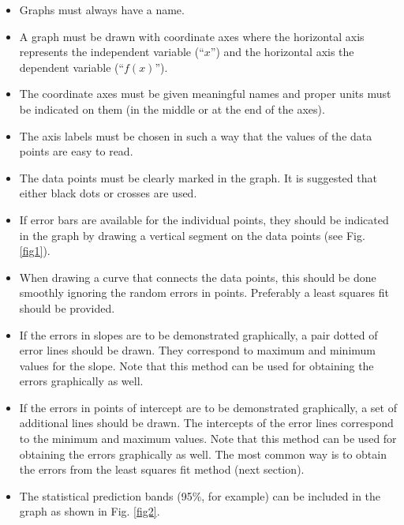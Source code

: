 \documentclass[byrevtex,amssymb,aps,pra,floatfix,letterpaper]{revtex4}
\begin{document}
\begin{itemize}
\item Graphs must always have a name.
\item A graph must be drawn with coordinate axes where the horizontal axis represents the independent variable (``$x$'') and the horizontal axis the dependent variable (``$f(x)$'').
\item The coordinate axes must be given meaningful names and proper units must be indicated on them (in the middle or at the end of the axes).
\item The axis labels must be chosen in such a way that the values of the data points are easy to read.
\item The data points must be clearly marked in the graph. It is suggested that either black dots or crosses are used.
\item If error bars are available for the individual points, they should be indicated in the graph by drawing a vertical segment on the data points (see Fig. \ref{fig1}).
\item When drawing a curve that connects the data points, this should be done smoothly ignoring the random errors in points. Preferably a least squares fit should be provided.
\item If the errors in slopes are to be demonstrated graphically, a pair dotted of error lines should be drawn. They correspond to maximum and minimum values for the slope. Note that this method can be used for obtaining the errors graphically as well.
\item If the errors in points of intercept are to be demonstrated graphically, a set of additional lines should be drawn. The intercepts of the error lines correspond to the minimum and maximum values. Note that this method can be used for obtaining the errors graphically as well. The most common way is to obtain the errors from the least squares fit method (next section).
\item The statistical prediction bands (95\%, for example) can be included in the graph as shown in Fig. \ref{fig2}.
\end{itemize}
\end{document}
